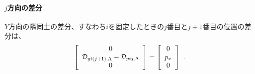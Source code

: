 \paragraph{$j$方向の差分}\noindent
$Y$方向の隣同士の差分、すなわち$i$を固定したときの$j$番目と$j+1$番目の位置の差分は、
\begin{align*}
  \left[
  \begin{array}{c}
    0\\
    \mathcal D_{yi(j+1),\text A}-\mathcal D_{yij,\text A}\\
    0
  \end{array}
  \right]
  = \left[
    \begin{array}{c}
      0\\
      p_x\\
      0
    \end{array}
    \right]\ .
\end{align*}


